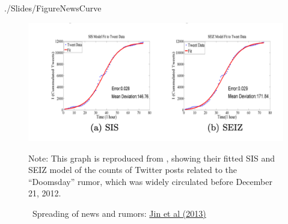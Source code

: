 \begin{verbatimwrite}{./Slides/FigureNewsCurve}
\begin{figure}[!ht] \centering  %
	\caption{ ~Spreading of news and rumors: \href{https://people.cs.vt.edu/ramakris/papers/news-rumor-epi-snakdd13.pdf}{Jin et al (2013)}}\nocite{jin2013epidemiological}
	\label{fig:news_curve}
	\centerline{\includegraphics[width=\textwidth]{./figures/Doomsday}}
		\begin{flushleft}{\footnotesize Note: This graph is reproduced from \cite{jin2013epidemiological}, showing their fitted SIS and SEIZ model of the counts of Twitter posts related to the ``Doomsday'' rumor, which was widely circulated before December 21, 2012.}
	\end{flushleft}
\end{figure}
\end{verbatimwrite}%


\newpage


